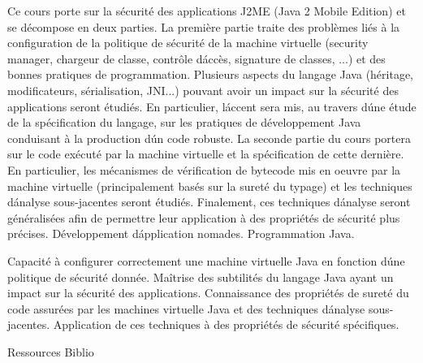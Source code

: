 




{
Ce cours porte sur la sécurité des applications J2ME (Java 2 Mobile Edition) et se décompose en deux parties.
La première partie traite des problèmes liés à la configuration de la politique de sécurité de la machine virtuelle
(security manager, chargeur de classe, contrôle  d\'accès, signature de classes, ...) et des bonnes pratiques de programmation.
Plusieurs aspects du langage Java (héritage, modificateurs,   sérialisation, JNI...) pouvant avoir un impact sur la sécurité des  applications seront étudiés.
En particulier, l\'accent sera mis, au travers d\'une étude de la spécification du langage, sur les pratiques de développement Java conduisant à la production d\'un code robuste.
La seconde partie du cours portera sur le code exécuté par la machine virtuelle et la spécification de cette dernière.
En particulier, les mécanismes de vérification de bytecode mis en oeuvre par la machine virtuelle (principalement basés sur la sureté du typage)
et les techniques d\'analyse sous-jacentes seront étudiés. Finalement, ces techniques d\'analyse seront généralisées afin de permettre
leur application à des propriétés de sécurité plus précises.
} 
{Développement d\'application nomades.
Programmation Java.} 
{\begin{itemize}
\ObjItem Capacité à configurer correctement une machine virtuelle Java en fonction d\'une politique de sécurité donnée.
\ObjItem Maîtrise des subtilités du langage Java ayant un impact sur la sécurité des applications.
\ObjItem Connaissance des propriétés de sureté du code assurées par les machines virtuelle Java et des techniques d\'analyse sous-jacentes.
\ObjItem Application de ces techniques à des propriétés de sécurité spécifiques.
\end{itemize} 
} 
{Ressources} 
{Biblio} 
 
